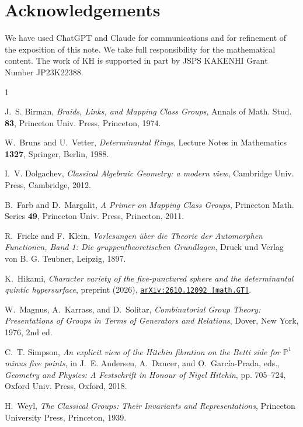\documentclass[12pt,reqno]{amsart}
\begin{document}
\section*{Acknowledgements}
We have used
ChatGPT  and Claude
for communications and 
for   refinement of the exposition of this note.
We take full  responsibility  for the  mathematical content.
The work of KH is supported in part by
JSPS KAKENHI
Grant Number JP23K22388.
\begin{thebibliography}{1}
\providecommand{\url}[1]{\texttt{#1}}
\providecommand{\urlprefix}{URL }
\providecommand{\eprint}[2][]{\url{#2}}

J.~S. Birman, \emph{Braids, Links, and Mapping Class Groups}, 
{Annals of Math. Stud.} \textbf{83}, Princeton Univ. Press, Princeton, 1974.

W.~Bruns and U.~Vetter, \emph{Determinantal Rings},  {Lecture
  Notes in Mathematics} \textbf{1327}, Springer, Berlin, 1988.

I.~V. Dolgachev, \emph{Classical Algebraic Geometry: a modern view}, Cambridge
  Univ. Press, Cambridge, 2012.

B.~Farb and D.~Margalit, \emph{A Primer on Mapping Class Groups},
{Princeton Math. Series} \textbf{49}, Princeton Univ. Press, Princeton, 2011.

R.~Fricke and F.~Klein, \emph{Vorlesungen {\"uber} die Theorie der Automorphen
  Functionen, Band 1: Die gruppentheoretischen Grundlagen}, Druck und Verlag
  von B. G. Teubner, Leipzig, 1897.

K.~Hikami, \emph{Character variety of the five-punctured sphere and the
  determinantal quintic hypersurface}, preprint  (2026),
  \href{https://arxiv.org/abs/2610.12092}{\texttt{arXiv:2610.12092 [math.GT]}}.

W.~Magnus, A.~Karrass, and D.~Solitar, \emph{Combinatorial Group Theory:
  Presentations of Groups in Terms of Generators and Relations}, Dover, New
  York, 1976, 2nd ed.

C.~T. Simpson, \emph{An explicit view of the {Hitchin} fibration on the {Betti}
  side for {$\mathbb{P}^1$} minus five points}, in J.~E. Andersen, A.~Dancer,
  and O.~Garc{\'{i}}a-Prada, eds., \emph{Geometry and Physics: A Festschrift in
  Honour of {Nigel} {Hitchin}}, pp. 705--724, Oxford Univ. Press, Oxford, 2018.

H.~Weyl, \emph{The Classical Groups: Their Invariants and Representations},
  Princeton University Press, Princeton, 1939.

\end{thebibliography}
\end{document}
